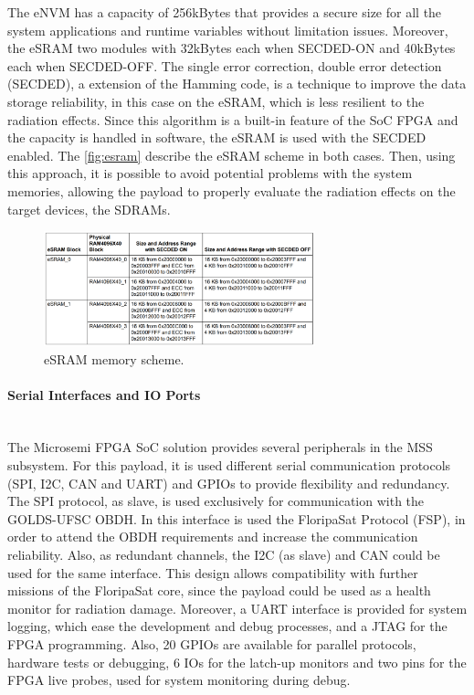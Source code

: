 The eNVM has a capacity of 256kBytes that provides a secure size for all the system applications and runtime variables without limitation issues. Moreover, the eSRAM two modules with 32kBytes each when SECDED-ON and 40kBytes each when SECDED-OFF. The single error correction, double error detection (SECDED), a extension of the Hamming code, is a technique to improve the data storage reliability, in this case on the eSRAM, which is less resilient to the radiation effects. Since this algorithm is a built-in feature of the SoC FPGA and the capacity is handled in software, the eSRAM is used with the SECDED enabled. The \autoref{fig:esram} describe the eSRAM scheme in both cases. Then, using this approach, it is possible to avoid potential problems with the system memories, allowing the payload to properly evaluate the radiation effects on the target devices, the SDRAMs. 

\begin{figure}[!ht]
    \begin{center}
        \includegraphics[width=0.7\textwidth]{figures/esram.png}
        \caption{eSRAM memory scheme.}
        \label{fig:esram}
    \end{center}
\end{figure}

\paragraph{Serial Interfaces and IO Ports} \mbox{}\\

The Microsemi FPGA SoC solution provides several peripherals in the MSS subsystem. For this payload, it is used different serial communication protocols (SPI, I2C, CAN and UART) and GPIOs to provide flexibility and redundancy. The SPI protocol, as slave, is used exclusively for communication with the GOLDS-UFSC OBDH. In this interface is used the FloripaSat Protocol (FSP), in order to attend the OBDH requirements and increase the communication reliability. Also, as redundant channels, the I2C (as slave) and CAN could be used for the same interface. This design allows compatibility with further missions of the FloripaSat core, since the payload could be used as a health monitor for radiation damage. Moreover, a UART interface is provided for system logging, which ease the development and debug processes, and a JTAG for the FPGA programming. Also, 20 GPIOs are available for parallel protocols, hardware tests or debugging, 6 IOs for the latch-up monitors and two pins for the FPGA live probes, used for system monitoring during debug. 

